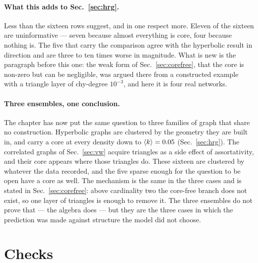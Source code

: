 \paragraph{What this adds to Sec.~\ref{sec:hrg}.} Less than the sixteen rows
suggest, and in one respect more. Eleven of the sixteen are uninformative ---
seven because almost everything is core, four because nothing is. The five that
carry the comparison agree with the hyperbolic result in direction and are
three to ten times worse in magnitude. What is new is the paragraph before
this one: the weak form of Sec.~\ref{sec:corefree}, that the core is non-zero
but can be negligible, was argued there from a constructed example with a
triangle layer of chy-degree $10^{-3}$, and here it is four real networks.

\paragraph{Three ensembles, one conclusion.} The chapter has now put the same
question to three families of graph that share no construction. Hyperbolic
graphs are clustered by the geometry they are built in, and carry a core at
every density down to $\langle k \rangle=0.05$ (Sec.~\ref{sec:hrg}). The correlated
graphs of Sec.~\ref{sec:vw} acquire triangles as a side effect of
assortativity, and their core appears where those triangles do. These sixteen
are clustered by whatever the data recorded, and the five sparse enough for the
question to be open have a core as well. The mechanism is the same in the three
cases and is stated in Sec.~\ref{sec:corefree}: above cardinality two the
core-free branch does not exist, so one layer of triangles is enough to remove
it. The three ensembles do not prove that --- the algebra does --- but they are
the three cases in which the prediction was made against structure the model
did not choose.

\section{Checks}
\label{sec:cover-checks}

